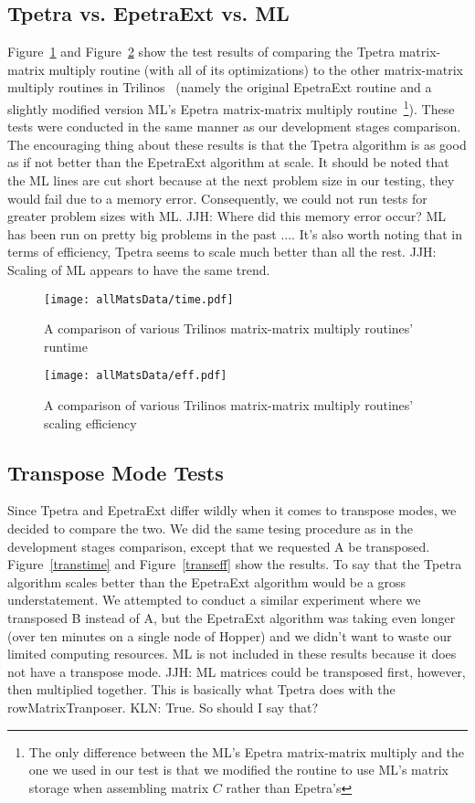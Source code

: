 \documentclass[pdf,12pt, strict]{SANDreport}
\newcommand{\JJH}[1]{\textcolor{jhuGreen}{JJH: #1}}
\newcommand{\KLN}[1]{\textcolor{klnBlue}{KLN: #1}}
\begin{document}
\subsection{Tpetra vs. EpetraExt vs. ML}
Figure~\ref{alltime} and Figure~\ref{alleff} show the test results of comparing the Tpetra matrix-matrix multiply routine 
(with all of its optimizations) to the other matrix-matrix multiply routines in Trilinos~\cite{1089021} (namely the original EpetraExt 
routine and a slightly modified version ML's Epetra matrix-matrix multiply routine~\footnote{The only difference between the ML's Epetra matrix-matrix
multiply and the one we used in our test is that we modified the routine to use ML's matrix storage when assembling matrix $C$ rather than Epetra's}). 
These tests were conducted in the same manner as our development stages comparison. 
The encouraging thing about these results is that the Tpetra algorithm is as good as if not better than the EpetraExt 
algorithm at scale. It should be noted that the ML lines are cut short because at the next problem size in our testing, 
they would fail due to a memory error. Consequently, we could not run tests for greater problem sizes with ML. 
\JJH{Where did this memory error occur?  ML has been run on pretty big problems in the past ....}
It's also worth noting that in terms of efficiency, Tpetra seems to scale much better than all the rest.
\JJH{Scaling of ML appears to have the same trend.}

\begin{figure}
\centering
\texttt{[image: allMatsData/time.pdf]}
\caption[All Algorithms Time Comparison]{A comparison of various Trilinos matrix-matrix multiply routines' runtime}
\label{alltime}
\end{figure}

\begin{figure}
\centering
\texttt{[image: allMatsData/eff.pdf]}
\caption[All Algorithms Efficiency Comparison]{A comparison of various Trilinos matrix-matrix multiply routines' scaling efficiency}
\label{alleff}
\end{figure}

\subsection{Transpose Mode Tests}
Since Tpetra and EpetraExt differ wildly when it comes to transpose modes, we decided to compare the two. We did the same
tesing procedure as in the development stages comparison, except that we requested A be transposed. Figure~\ref{transtime}
and Figure~\ref{transeff} show the results. To say that the Tpetra algorithm scales better than the EpetraExt algorithm
would be a gross understatement. We attempted to conduct a similar experiment where we transposed B instead of A, 
but the EpetraExt algorithm was taking even longer (over ten minutes on a single node of Hopper) and we didn't want to 
waste our limited computing resources. ML is not included in these results because it does not have a transpose mode.
\JJH{ML matrices could be transposed first, however, then multiplied together.  This is basically what Tpetra does with
the rowMatrixTranposer.}
\KLN{True. So should I say that?}
\end{document}
